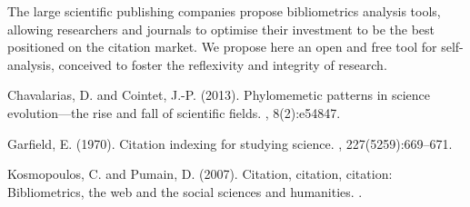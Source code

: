 \documentclass[11pt]{article}
\begin{document}
\bigskip


The large scientific publishing companies propose bibliometrics analysis tools, allowing researchers and journals to optimise their investment to be the best positioned on the citation market. We propose here an open and free tool for self-analysis, conceived to foster the reflexivity and integrity of research.


\bigskip


%
%

\begin{thebibliography}{}

Chavalarias, D. and Cointet, J.-P. (2013).
\newblock Phylomemetic patterns in science evolution—the rise and fall of
  scientific fields.
, 8(2):e54847.

Garfield, E. (1970).
\newblock Citation indexing for studying science.
, 227(5259):669--671.

Kosmopoulos, C. and Pumain, D. (2007).
\newblock Citation, citation, citation: Bibliometrics, the web and the social
  sciences and humanities.
.

\end{thebibliography}
\end{document}
